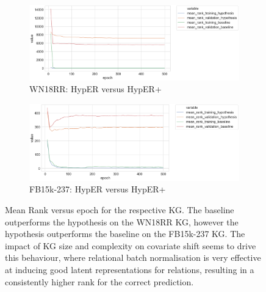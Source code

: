 
\begin{figure}[H]
	\begin{subfigure}[b]{.5\linewidth}
   		\centering
    		\includegraphics[width=1.0\linewidth, height=0.6\linewidth]{WN18RR_mean_rank_Results}
		\captionsetup{justification=centering}
		\caption{WN18RR: HypER versus HypER+}
	\end{subfigure}
	\begin{subfigure}[b]{.5\linewidth}
   		\centering
		\includegraphics[width=1.0\linewidth, height=0.6\linewidth]{FB15k-237_mean_rank_Results}
		\captionsetup{justification=centering}
		\caption{FB15k-237: HypER versus HypER+}
	\end{subfigure}
	\captionsetup{justification=centering}
	\caption{Mean Rank versus epoch for the respective KG. The baseline outperforms the hypothesis on the WN18RR KG, however the hypothesis outperforms the baseline on the FB15k-237 KG. The impact of KG size and complexity on covariate shift seems to drive this behaviour, where relational batch normalisation is very effective at inducing good latent representations for relations, resulting in a consistently higher rank for the correct prediction.}
\end{figure}

